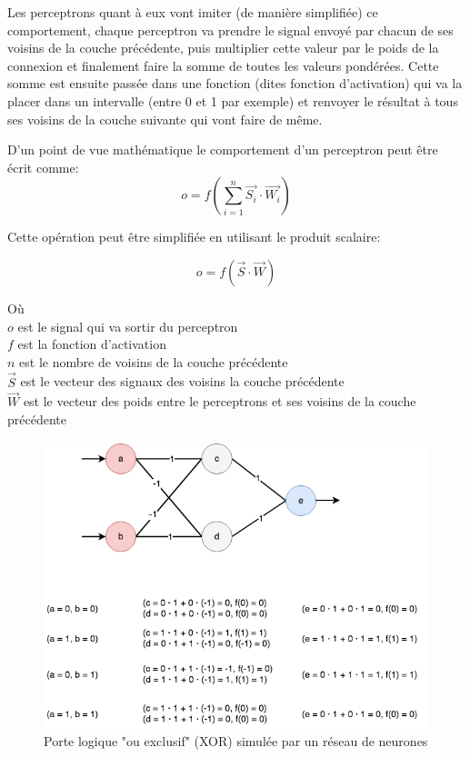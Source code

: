 \documentclass{article}
\begin{document}
Les perceptrons quant à eux vont imiter (de manière simplifiée) ce comportement, chaque perceptron va prendre le signal envoyé par chacun de ses voisins de la couche précédente, puis multiplier cette valeur par le poids de la connexion et finalement faire la somme de toutes les valeurs pondérées. Cette somme est ensuite passée dans une fonction (dites fonction d'activation) qui va la placer dans un intervalle (entre 0 et 1 par exemple) et renvoyer le résultat à tous ses voisins de la couche suivante qui vont faire de même\cite{wikiperceptron}.

D'un point de vue mathématique le comportement d'un perceptron peut être écrit comme:
\begin{equation}
o = f(\sum_{i=1}^{n} \vec{S_i} \cdot \vec{W_i})
\label{eq:percep}
\end{equation}

Cette opération peut être simplifiée en utilisant le produit scalaire:

\begin{equation}
o = f(\vec{S} \cdot \vec{W})
\end{equation}

Où\\
$o$ est le signal qui va sortir du perceptron\\
$f$ est la fonction d'activation\\
$n$ est le nombre de voisins de la couche précédente\\
$\vec{S}$ est le vecteur des signaux des voisins la couche précédente\\
$\vec{W}$ est le vecteur des poids entre le perceptrons et ses voisins de la couche précédente

\begin{figure}[H]
\begin{center}
	\includegraphics[scale=0.6]{xor.png} 
	\caption{Porte logique "ou exclusif" (XOR) simulée par un réseau de neurones}
\end{center}
\end{figure}
\end{document}
